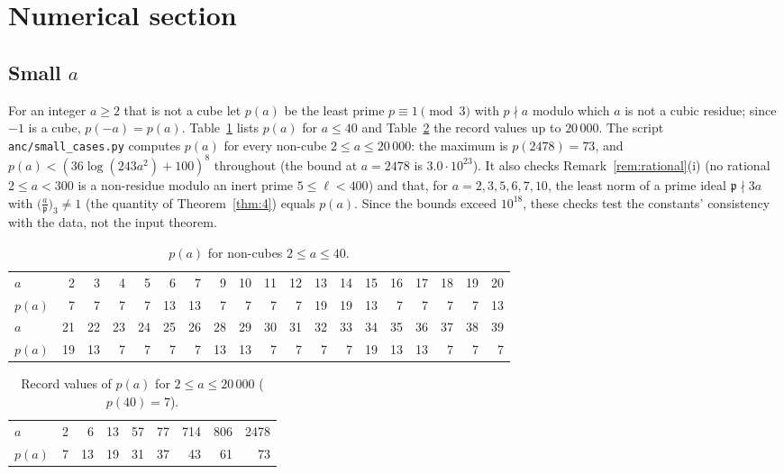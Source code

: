 \documentclass[11pt]{article}
\theoremstyle{definition}
\theoremstyle{remark}
\numberwithin{equation}{section}
\newcommand{\fp}{\mathfrak p}
\newcommand{\cubic}[2]{\bigl(\tfrac{#1}{#2}\bigr)_{3}}
\begin{document}
\section{Numerical section}\label{sec:numerics}

\subsection{Small \texorpdfstring{$a$}{a}}\label{sec:smalla}
For an integer $a\ge2$ that is not a cube let $p(a)$ be the least prime $p\equiv1\pmod3$ with $p\nmid a$ modulo which $a$ is not a cubic residue; since $-1$ is a cube, $p(-a)=p(a)$. Table~\ref{tab:small} lists $p(a)$ for $a\le40$ and Table~\ref{tab:records} the record values up to $20\,000$. The script \texttt{anc/small\_cases.py} computes $p(a)$ for every non-cube $2\le a\le20\,000$: the maximum is $p(2478)=73$, and $p(a)<(36\log(243a^2)+100)^8$ throughout (the bound at $a=2478$ is $3.0\cdot10^{23}$). It also checks Remark~\ref{rem:rational}(i) (no rational $2\le a<300$ is a non-residue modulo an inert prime $5\le\ell<400$) and that, for $a=2,3,5,6,7,10$, the least norm of a prime ideal $\fp\nmid3a$ with $\cubic{a}{\fp}\ne1$ (the quantity of Theorem~\ref{thm:4}) equals $p(a)$. Since the bounds exceed $10^{18}$, these checks test the constants' consistency with the data, not the input theorem.

\begin{table}[ht]
\centering\small
\caption{$p(a)$ for non-cubes $2\le a\le40$.}\label{tab:small}
\begin{tabular}{l*{18}{r}}
\toprule
$a$ & 2 & 3 & 4 & 5 & 6 & 7 & 9 & 10 & 11 & 12 & 13 & 14 & 15 & 16 & 17 & 18 & 19 & 20\\
$p(a)$ & 7 & 7 & 7 & 7 & 13 & 13 & 7 & 7 & 7 & 7 & 19 & 19 & 13 & 7 & 7 & 7 & 7 & 13\\
\midrule
$a$ & 21 & 22 & 23 & 24 & 25 & 26 & 28 & 29 & 30 & 31 & 32 & 33 & 34 & 35 & 36 & 37 & 38 & 39\\
$p(a)$ & 19 & 13 & 7 & 7 & 7 & 7 & 13 & 13 & 7 & 7 & 7 & 7 & 19 & 13 & 13 & 7 & 7 & 7\\
\bottomrule
\end{tabular}
\end{table}

\begin{table}[ht]
\centering\small
\caption{Record values of $p(a)$ for $2\le a\le20\,000$ ($p(40)=7$).}\label{tab:records}
\begin{tabular}{l*{8}{r}}
\toprule
$a$ & 2 & 6 & 13 & 57 & 77 & 714 & 806 & 2478\\
$p(a)$ & 7 & 13 & 19 & 31 & 37 & 43 & 61 & 73\\
\bottomrule
\end{tabular}
\end{table}
\end{document}
